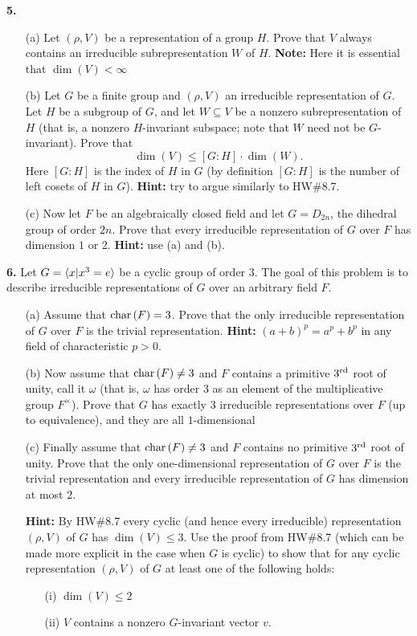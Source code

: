 \documentclass[12pt]{amsart}
\begin{document}
\skv
{\bf 5.} %
\begin{itemize}
\item[(a)] Let $(\rho,V)$ be a representation of a group $H$. Prove that $V$ always contains an irreducible subrepresentation $W$
of $H$. {\bf Note:} Here it is essential that $\dim(V)<\infty$ 
\item[(b)] Let $G$ be a finite group and $(\rho,V)$ an irreducible representation of $G$. Let $H$ be a subgroup of $G$, and let $W\subseteq V$
be a nonzero subrepresentation of $H$ (that is, a nonzero $H$-invariant subspace; note that $W$ need not be $G$-invariant). Prove that 
$$\dim(V)\leq [G:H]\cdot\dim(W).$$ Here $[G:H]$ is the index of $H$ in $G$ (by definition $[G:H]$ is the number of left cosets of $H$ in $G$).
{\bf Hint:} try to argue similarly to HW\#8.7.
\item[(c)] Now let $F$ be an algebraically closed field and let $G=D_{2n}$, the dihedral group of order $2n$. Prove that every irreducible representation of $G$ over $F$ has dimension $1$ or $2$. {\bf Hint:} use (a) and (b).
\end{itemize}
\skv
{\bf 6.} Let $G={\langle} x| x^3=e{\rangle}$ be a cyclic group of order $3$. The goal of this problem is to describe irreducible representations of $G$
over an arbitrary field $F$.
\begin{itemize}
\item[(a)] Assume that ${\rm char\,}(F)=3$. Prove that the only irreducible representation of $G$ over $F$ is the trivial representation. 
{\bf Hint:} $(a+b)^p=a^p+b^p$ in any field of characteristic $p>0$.
\item[(b)] Now assume that ${\rm char\,}(F)\neq 3$ and $F$ contains a primitive $3^{\rm rd}$ root of unity, call it $\omega$ (that is, $\omega$
has order $3$ as an element of the multiplicative group $F^{\times}$). Prove that $G$ has exactly $3$ irreducible representations over $F$
(up to equivalence), and they are all $1$-dimensional
 \item[(c)] Finally assume that ${\rm char\,}(F)\neq 3$ and $F$ contains no primitive $3^{\rm rd}$ root of unity. Prove that 
 the only one-dimensional representation of $G$ over $F$ is the trivial representation and every irreducible representation of $G$ has dimension at most $2$. 

\skv
{\bf Hint:} By HW\#8.7 every cyclic (and hence every irreducible) representation $(\rho,V)$ of $G$ has $\dim(V)\leq 3$.
Use the proof from HW\#8.7 (which can be made more explicit in the case when $G$ is cyclic) to show that for any cyclic representation
$(\rho,V)$ of $G$ at least one of the following holds:
\begin{itemize}
\item[(i)] $\dim(V)\leq 2$
\item[(ii)] $V$ contains a nonzero $G$-invariant vector $v$.
\end{itemize}
\end{itemize}
\end{document}
